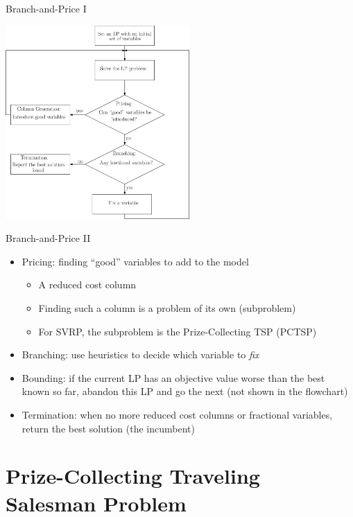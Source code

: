 \documentclass[10pt]{beamer}
\begin{document}
\begin{frame}{Branch-and-Price I}
\begin{center}
        \includegraphics[width=7cm]{Branch_and_Price.eps} 
\end{center}
\end{frame}

\begin{frame}{Branch-and-Price II}
\begin{itemize}
    \item<1-> Pricing: finding ``good'' variables to add to the model
    \begin{itemize}
        \item<2-> A \alert{reduced cost} column
        \item<3-> Finding such a column is a problem of its own (\alert{subproblem})
        \item<4-> For SVRP, the subproblem is the \alert{Prize-Collecting TSP} (PCTSP)
    \end{itemize}
    \item<5-> Branching: use heuristics to decide which variable to \emph{fix}
    \item<6-> Bounding: if the current LP has an objective value worse than the best known so far, abandon this LP and go the next (not shown in the flowchart)
    \item<7-> Termination: when no more reduced cost columns or fractional variables, return the best solution (the \alert{incumbent})
\end{itemize}
\end{frame}


\section{Prize-Collecting Traveling Salesman Problem}
\end{document}
